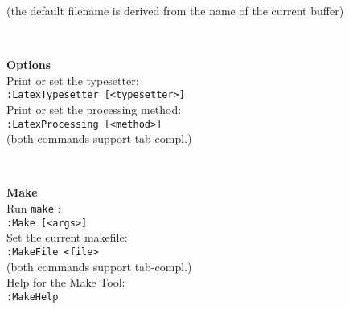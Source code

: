 \documentclass[oneside,10pt,landscape,DIV16]{scrartcl}
\begin{document}
\begin{multicols}{3}
\begin{center}
\begin{minipage}[b]{70mm}
(the default filename is derived from the name of the current buffer)
\end{minipage}
\\[2.5ex]
%
\begin{minipage}[b]{70mm}%
\large{\textbf{Options}}\\[1.0ex]
Print or set the typesetter: \\[1.0ex]
\texttt{:LatexTypesetter [<typesetter>]} \\[1.0ex]
Print or set the processing method: \\[1.0ex]
\texttt{:LatexProcessing [<method>]} \\[1.0ex]
(both commands support tab-compl.)
\end{minipage}
\\[2.5ex]
%
\begin{minipage}[b]{70mm}%
\large{\textbf{Make}}\\[1.0ex]
Run \texttt{make} : \\[1.0ex]
\texttt{:Make [<args>]} \\[1.0ex]
Set the current makefile: \\[1.0ex]
\texttt{:MakeFile <file>} \\[1.0ex]
(both commands support tab-compl.) \\[1.0ex]
Help for the Make Tool: \\[1.0ex]
\texttt{:MakeHelp} \\[2.5ex]
\end{minipage}
%
\end{center}%
\end{multicols}%
%
\end{document}
